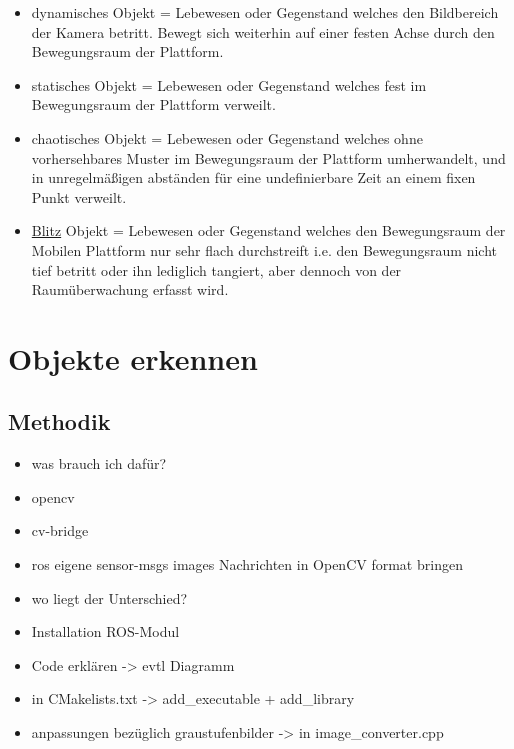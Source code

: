 		\begin{itemize}
		\item dynamisches Objekt = Lebewesen oder Gegenstand welches den Bildbereich der Kamera betritt. Bewegt sich weiterhin auf einer festen Achse durch den Bewegungsraum der Plattform.
		\item statisches Objekt = Lebewesen oder Gegenstand welches fest im Bewegungsraum der Plattform verweilt.
		\item chaotisches Objekt = Lebewesen oder Gegenstand welches ohne vorhersehbares Muster im Bewegungsraum der Plattform umherwandelt, und in unregelmäßigen abständen für eine undefinierbare Zeit an einem fixen Punkt verweilt.
		\item \underline{Blitz} Objekt = Lebewesen oder Gegenstand welches den Bewegungsraum der Mobilen Plattform nur sehr flach durchstreift i.e. den Bewegungsraum nicht tief betritt oder ihn lediglich tangiert, aber dennoch von der Raumüberwachung erfasst wird.
		\end{itemize}
		
		
		\section{Objekte erkennen}
					
			\subsection{Methodik}
				\begin{itemize}
				\item was brauch ich dafür?
				\item opencv
				\item cv-bridge
				\item ros eigene sensor-msgs images Nachrichten in OpenCV format bringen
				\item wo liegt der Unterschied?
				\item Installation ROS-Modul
				\item Code erklären -> evtl Diagramm
				\item in CMakelists.txt -> add\_executable + add\_library
				\item anpassungen bezüglich graustufenbilder -> in image\_converter.cpp
				\end{itemize}
				
